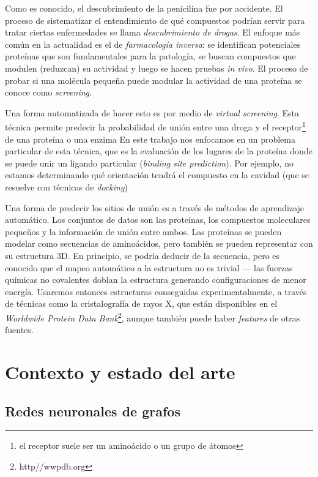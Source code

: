 \documentclass[
    left=2.0cm,         %
    right=2.0cm,        %
    top=2.0cm,          %
    bottom=2.5cm,         %
    bindingoffset=6mm,  %
    nohyphenation=false %
]{eiti/eiti-thesis}
\begin{document}
Como es conocido, el descubrimiento de la penicilina fue por accidente. El proceso
de sistematizar el entendimiento de qué compuestos podrían servir para tratar ciertas 
enfermedades se llama \textit{descubrimiento de drogas}. El enfoque más común en
la actualidad es el de \textit{farmacología inversa}: se identifican potenciales
proteínas que son fundamentales para la patología, se buscan compuestos que modulen
(reduzcan) su actividad y luego se hacen pruebas \textit{in vivo}. El proceso de
probar si una molécula pequeña puede modular la actividad de una proteína se
conoce como \textit{screening}.

Una forma automatizada de hacer esto es por medio de \textit{virtual screening}.
Esta técnica permite predecir la probabilidad de unión entre una droga y el 
receptor\footnote{el receptor suele ser un aminoácido o un %
grupo de átomos} de una proteína o una enzima
En este trabajo nos enfocamos en un problema particular de esta técnica,
que es la evaluación de los lugares de la proteína donde se puede
unir un ligando particular (\textit{binding site prediction}). Por ejemplo,
no estamos determinando qué orientación tendrá el compuesto en la cavidad
(que se resuelve con técnicas de \textit{docking})


Una forma de predecir los sitios de unión es a través de métodos de aprendizaje
automático. Los conjuntos de datos son las proteínas, los compuestos moleculares
pequeños y la información de unión entre ambos. Las proteínas se
pueden modelar como secuencias de aminoácidos, pero 
también se pueden representar con su estructura 3D. En principio, se podría deducir
de la secuencia, pero 
es conocido que el mapeo automático a la
estructura no es trivial --- las fuerzas químicas no covalentes
doblan la estructura generando configuraciones de menor energía. Usaremos entonces
estructuras conseguidas experimentalmente, a través de técnicas como la cristalografía
de rayos X, que están disponibles en el \textit{Worldwide Protein Data Bank}\footnote{http//wwpdb.org},
aunque también puede haber \textit{features} de otras fuentes.

\section{Contexto y estado del arte}
\subsection{Redes neuronales de grafos}
\end{document}
